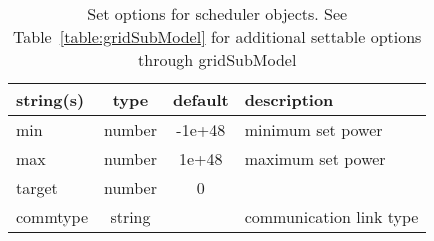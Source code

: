 \begin{table}[ht]
\centering
\begin{tabular}{p{5cm} c c p{7cm}}
\hline
string(s) & type & default & description \\
\hline
min & number & -1e+48 & minimum set power\\
max & number & 1e+48 & maximum set power\\
target & number & 0 & \\
commtype & string &  & communication link type\\
\hline
\end{tabular}
\caption{Set options for scheduler objects. See Table~\ref{table:gridSubModel} for additional settable options through gridSubModel}
\label{table:scheduler}
\end{table}
